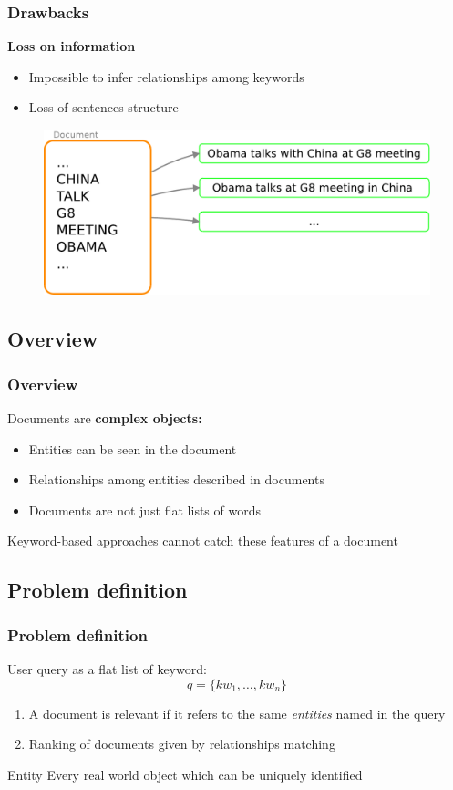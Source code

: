 \documentclass{beamer}
\begin{document}
\begin{frame}
\frametitle{Drawbacks}
{\color{red}\bfseries{Loss on information}}\\
\smallskip
\begin{itemize}
\item Impossible to infer relationships among keywords
\item Loss of sentences structure
\end{itemize}
\bigskip
\begin{center}
\begin{figure}
\includegraphics[scale=0.45]{imgs/lossinfo}
\end{figure}
\end{center}
\end{frame}

\subsection{Overview}

\begin{frame}
\frametitle{Overview}
Documents are {\bfseries complex objects:}
\bigskip
\begin{itemize}
\item Entities can be seen in the document
\item Relationships among entities described in documents
\item Documents are not just flat lists of words
\end{itemize}
\bigskip
Keyword-based approaches cannot catch these features of a document
\end{frame}

\subsection{Problem definition}

\begin{frame}
\frametitle{Problem definition}
User query as a flat list of keyword:
$$
q = \{kw_{1}, \dots, kw_{n}\}
$$
\begin{enumerate}
\item A document is relevant if it refers to the same \emph{entities}
  named in the query
\item Ranking of documents given by relationships matching
\end{enumerate}
\bigskip
\begin{exampleblock}{Entity}
Every real world object which can be uniquely identified
\end{exampleblock}
\end{frame}
\end{document}

